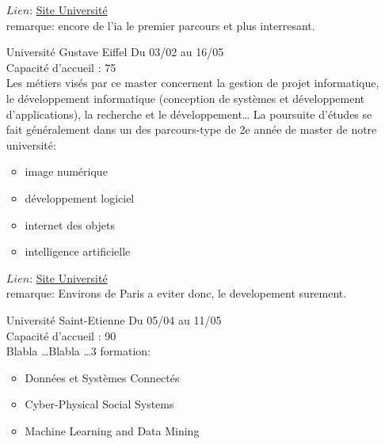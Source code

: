 \documentclass[a4paper,11pt]{article}
\begin{document}
\begin{enumerate}
                    $Lien$: \href{http://www.univ-lemans.fr/fr/formation/catalogue-des-formations/master-lmd-MLMD/sciences-technologies-sante-0004/master-informatique-IXQ1QBYN.html}{Site Université}
                    \\ remarque: encore de l'ia le premier parcours et plus interresant.
\\
        \item [\color{LightOrangeHaf}Université Gustave Eiffel] Du 03/02 au 16/05
                    \\Capacité d'accueil : 75
                    \\Les métiers visés par ce master concernent la gestion de projet informatique, le développement informatique (conception de systèmes et développement d’applications), la recherche et le développement… La poursuite d'études se fait généralement dans un des parcours-type de 2e année de master de notre université:
                    \begin{itemize}
                        \item image numérique 
                        \item développement logiciel 
                        \item internet des objets
                        \item intelligence artificielle
                    \end{itemize}
                    $Lien$: \href{https://formations.univ-gustave-eiffel.fr/index.php?id=1941&tx_agof_brochure%5Bbrochure%5D=693&tx_agof_brochure%5Bcontroller%5D=Brochure&tx_agof_brochure%5Baction%5D=show&cHash=34eb0a5b9846ddb9befcec49d7ffaa2a}{Site Université}
                    \\ remarque: Environs de Paris a eviter donc, le developement surement.
\\
        \item [\color{LightOrangeHaf}Université Saint-Etienne] Du 05/04 au 11/05
                    \\Capacité d'accueil : 90
                    \\Blabla \ldots Blabla \dots 3 formation:
                    \begin{itemize}
                        \item Données et Systèmes Connectés
                        \item Cyber-Physical Social Systems
                        \item Machine Learning and Data Mining
                    \end{itemize}

\end{enumerate}
\end{document}
